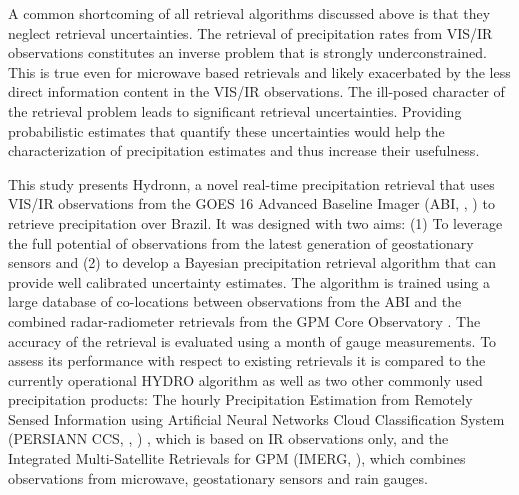 \documentclass[journal abbreviation, manuscript]{copernicus}
\begin{document}
A common shortcoming of all retrieval algorithms discussed above is that they
neglect retrieval uncertainties. The retrieval of precipitation rates from
VIS/IR observations constitutes an inverse problem that is strongly
underconstrained. This is true even for microwave based retrievals and likely
exacerbated by the less direct information content in the VIS/IR observations.
The ill-posed character of the retrieval problem leads to significant retrieval
uncertainties. Providing probabilistic estimates that quantify these
uncertainties would help the characterization of precipitation estimates and
thus increase their usefulness.

This study presents Hydronn, a novel real-time precipitation retrieval that uses
VIS/IR observations from the GOES 16 Advanced Baseline Imager (ABI,
\citeauthor{schmit18}, \citeyear{schmit18}) to retrieve precipitation over
Brazil. It was designed with two aims: (1) To leverage the full potential of
observations from the latest generation of geostationary sensors and (2) to
develop a Bayesian precipitation retrieval algorithm that can provide well
calibrated uncertainty estimates. The algorithm is trained using a large
database of co-locations between observations from the ABI and the combined
radar-radiometer retrievals from the GPM Core Observatory \citep{grecu16} . The
accuracy of the retrieval is evaluated using a month of gauge measurements. To
assess its performance with respect to existing retrievals it is compared to the
currently operational HYDRO algorithm as well as two other commonly used
precipitation products: The hourly Precipitation Estimation from Remotely Sensed
Information using Artificial Neural Networks Cloud Classification System
(PERSIANN CCS, \citeauthor{hong04}, \citeyear{hong04}) , which is based on IR
observations only, and the Integrated Multi-Satellite Retrievals for GPM (IMERG,
\citeauthor{huffman20} \citeyear{huffman20}), which combines observations from
microwave, geostationary sensors and rain gauges.

\end{document}
